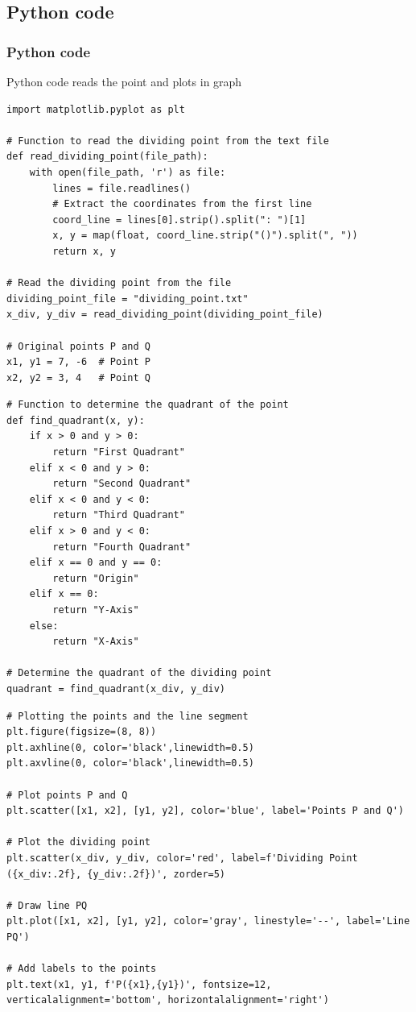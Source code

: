 \documentclass{beamer}
\theoremstyle{remark}
\numberwithin{equation}{section}
\begin{document}
\subsection{Python code}
\begin{frame}[fragile]
\frametitle{Python code}
Python code reads the point and plots in graph
            \lstset{style=Pythonstyle}
            \begin{lstlisting}
import matplotlib.pyplot as plt

# Function to read the dividing point from the text file
def read_dividing_point(file_path):
    with open(file_path, 'r') as file:
        lines = file.readlines()
        # Extract the coordinates from the first line
        coord_line = lines[0].strip().split(": ")[1]
        x, y = map(float, coord_line.strip("()").split(", "))
        return x, y

# Read the dividing point from the file
dividing_point_file = "dividing_point.txt"
x_div, y_div = read_dividing_point(dividing_point_file)

# Original points P and Q
x1, y1 = 7, -6  # Point P
x2, y2 = 3, 4   # Point Q
\end{lstlisting}
\end{frame}
\begin{frame}[fragile]
\lstset{style=Pythonstyle}
\begin{lstlisting}
# Function to determine the quadrant of the point
def find_quadrant(x, y):
    if x > 0 and y > 0:
        return "First Quadrant"
    elif x < 0 and y > 0:
        return "Second Quadrant"
    elif x < 0 and y < 0:
        return "Third Quadrant"
    elif x > 0 and y < 0:
        return "Fourth Quadrant"
    elif x == 0 and y == 0:
        return "Origin"
    elif x == 0:
        return "Y-Axis"
    else:
        return "X-Axis"

# Determine the quadrant of the dividing point
quadrant = find_quadrant(x_div, y_div)
\end{lstlisting}
\end{frame}
\begin{frame}[fragile]
\lstset{style=Pythonstyle}
\begin{lstlisting}
# Plotting the points and the line segment
plt.figure(figsize=(8, 8))
plt.axhline(0, color='black',linewidth=0.5)
plt.axvline(0, color='black',linewidth=0.5)

# Plot points P and Q
plt.scatter([x1, x2], [y1, y2], color='blue', label='Points P and Q')

# Plot the dividing point
plt.scatter(x_div, y_div, color='red', label=f'Dividing Point ({x_div:.2f}, {y_div:.2f})', zorder=5)

# Draw line PQ
plt.plot([x1, x2], [y1, y2], color='gray', linestyle='--', label='Line PQ')

# Add labels to the points
plt.text(x1, y1, f'P({x1},{y1})', fontsize=12, verticalalignment='bottom', horizontalalignment='right')
\end{lstlisting}
\end{frame}
\end{document}
